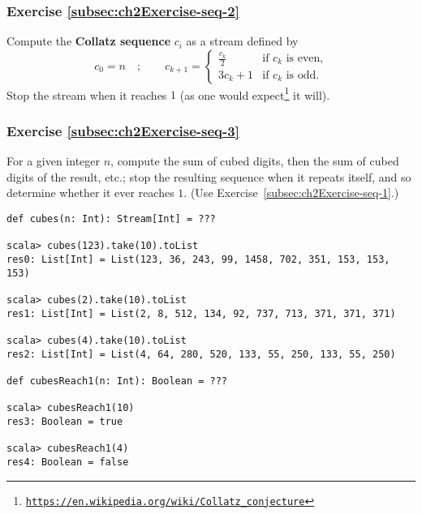 \subsubsection{Exercise \label{subsec:ch2Exercise-seq-2}\ref{subsec:ch2Exercise-seq-2}}

Compute the \textbf{Collatz sequence} $c_{i}$
as a stream defined by
\[
c_{0}=n\quad;\quad\quad c_{k+1}=\begin{cases}
\frac{c_{k}}{2} & \text{if }c_{k}\text{ is even,}\\
3c_{k}+1 & \text{if }c_{k}\text{ is odd.}
\end{cases}
\]
Stop the stream when it reaches $1$ (as one would expect\footnote{\texttt{\href{https://en.wikipedia.org/wiki/Collatz_conjecture}{https://en.wikipedia.org/wiki/Collatz\_conjecture}}}
it will).

\subsubsection{Exercise \label{subsec:ch2Exercise-seq-3}\ref{subsec:ch2Exercise-seq-3}}

For a given integer $n$, compute the sum of cubed digits, then the
sum of cubed digits of the result, etc.; stop the resulting sequence
when it repeats itself, and so determine whether it ever reaches $1$.
(Use Exercise~\ref{subsec:ch2Exercise-seq-1}.)
\begin{lstlisting}
def cubes(n: Int): Stream[Int] = ???

scala> cubes(123).take(10).toList
res0: List[Int] = List(123, 36, 243, 99, 1458, 702, 351, 153, 153, 153)

scala> cubes(2).take(10).toList
res1: List[Int] = List(2, 8, 512, 134, 92, 737, 713, 371, 371, 371)

scala> cubes(4).take(10).toList
res2: List[Int] = List(4, 64, 280, 520, 133, 55, 250, 133, 55, 250)

def cubesReach1(n: Int): Boolean = ???

scala> cubesReach1(10)
res3: Boolean = true

scala> cubesReach1(4)
res4: Boolean = false
\end{lstlisting}
\begin{comment}
Solution:
\begin{lstlisting}
def digitsOf(n: Int): Seq[Int] = Stream.iterate(n)(_ / 10).takeWhile(_ != 0).map(_ % 10).toList
def cubeDigits(n: Int): Int = digitsOf(n).map(x => x*x*x).sum
def cubes(n: Int): Stream[Int] = Stream.iterate(n)(cubeDigits)
def stopRepeats[T](str: Stream[T]): Stream[T] = {
  val halfSpeed = str.flatMap(x => Seq(x, x))
  val result = halfSpeed.zip(str).drop(1).takeWhile{ case (h, s) => h != s }.map(_._2)
  if (result.isEmpty) str.take(1) else str
}
def cubesReach1(n: Int): Boolean = stopRepeats(cubes(n)).contains(1)
\end{lstlisting}
\end{comment}


